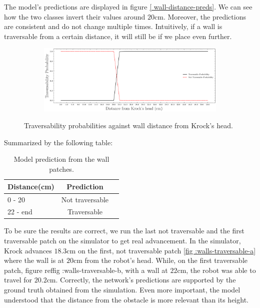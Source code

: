 \documentclass[../document.tex]{subfiles}
\begin{document}
The model's predictions are displayed in figure \ref{ wall-distance-preds}. We can see how the two classes invert their values around $20$cm. Moreover, the predictions are consistent and do not change multiple times. Intuitively, if a wall is traversable from a certain distance, it will still be if we place even further.
\begin{figure} [htbp]
    \centering
\begin{subfigure}[b]{1\textwidth}
    \includegraphics[width=\linewidth]{../img/5/custom_patches/walls_front/predictions.png}
    \end{subfigure}
    \caption{Traversability probabilities against wall distance from Krock's head.}
\label{wall-distance-preds}
\end{figure}
Summarized by the following table:
\begin{table} [htbp]
    \centering
    \begin{tabular}{l|cc}
        Distance(cm) & Prediction \\ 
        \hline
        0 - 20  & Not traversable \\ 
        22 - end & Traversable \\ 
        \hline
    \end{tabular}
    \caption{Model prediction from the wall patches.}
\end{table}
To be sure the results are correct, we run the last not traversable and the first traversable patch on the simulator to get real advancement. In the simulator, Krock advances $18.3$cm on the first, not traversable patch \ref{fig :walls-traversable-a} where the wall is at $20$cm from the robot's head. While, on the first traversable patch, figure ref{fig :walls-traversable-b}, with a wall at $22$cm, the robot was able to travel for $20.2$cm. Correctly, the network's predictions are supported by the ground truth obtained from the simulation. Even more important, the model understood that the distance from the obstacle is more relevant than its height.
\end{document}
